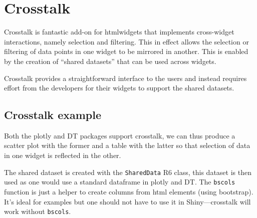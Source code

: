 \documentclass[
]{krantz}
\makeatletter
\newenvironment{Shaded}{\begin{snugshade}}{\end{snugshade}}
\newcommand{\DataTypeTok}[1]{\textcolor[rgb]{0.27,0.27,0.27}{#1}}
\newcommand{\KeywordTok}[1]{\textcolor[rgb]{0.27,0.27,0.27}{\textbf{#1}}}
\newcommand{\NormalTok}[1]{#1}
\newcommand{\OperatorTok}[1]{\textcolor[rgb]{0.43,0.43,0.43}{\textbf{#1}}}
\newcommand{\StringTok}[1]{\textcolor[rgb]{0.5,0.5,0.5}{#1}}
\newenvironment{kframe}{%
\medskip{}
\setlength{\fboxsep}{.8em}
 \def\at@end@of@kframe{}%
 \ifinner\ifhmode%
  \def\at@end@of@kframe{\end{minipage}}%
  \begin{minipage}{\columnwidth}%
 \fi\fi%
 \def\FrameCommand##1{\hskip\@totalleftmargin \hskip-\fboxsep
 \colorbox{shadecolor}{##1}\hskip-\fboxsep
     \hskip-\linewidth \hskip-\@totalleftmargin \hskip\columnwidth}%
 \MakeFramed {\advance\hsize-\width
   \@totalleftmargin\z@ \linewidth\hsize
   \@setminipage}}%
 {\par\unskip\endMakeFramed%
 \at@end@of@kframe}
\renewenvironment{Shaded}{\begin{kframe}}{\end{kframe}}
\makeatother
\begin{document}
\hypertarget{crosstalk}{%
\chapter{Crosstalk}\label{crosstalk}}

Crosstalk \citep{R-crosstalk} is fantastic add-on for htmlwidgets that implements cross-widget interactions, namely selection and filtering. This in effect allows the selection or filtering of data points in one widget to be mirrored in another. This is enabled by the creation of ``shared datasets'' that can be used across widgets.

Crosstalk provides a straightforward interface to the users and instead requires effort from the developers for their widgets to support the shared datasets.

\hypertarget{crosstalk-example}{%
\section{Crosstalk example}\label{crosstalk-example}}

Both the plotly and DT packages support crosstalk, we can thus produce a scatter plot with the former and a table with the latter so that selection of data in one widget is reflected in the other.

The shared dataset is created with the \texttt{SharedData} R6 class, this dataset is then used as one would use a standard dataframe in plotly and DT. The \texttt{bscols} function is just a helper to create columns from html elements (using bootstrap). It's ideal for examples but one should not have to use it in Shiny---crosstalk will work without \texttt{bscols}.

\begin{Shaded}
\end{Shaded}
\end{document}
